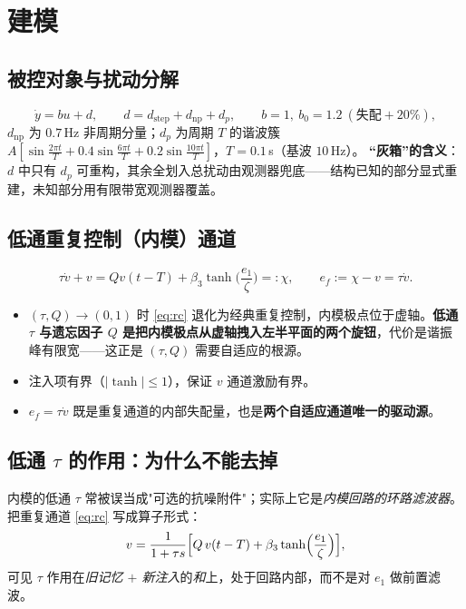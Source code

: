 \documentclass[11pt,a4paper]{article}
\theoremstyle{remark}\newtheorem{remark}{注}
\newcommand{\ef}{e_f}
\newcommand{\st}{\operatorname{tanh}}
\begin{document}
\section{建模}\label{sec:model}
\subsection{被控对象与扰动分解}
\begin{equation}
  \dot y = b u+d,\qquad d = d_{\mathrm{step}}+d_{\mathrm{np}}+d_p,\qquad b=1,\ b_0=1.2\ (\text{失配}+20\%),
\end{equation}
$d_{\mathrm{np}}$ 为 $0.7\,$Hz 非周期分量；$d_p$ 为周期 $T$ 的谐波簇
$A[\sin\frac{2\pi t}{T}+0.4\sin\frac{6\pi t}{T}+0.2\sin\frac{10\pi t}{T}]$，$T=0.1\,$s（基波 $10\,$Hz）。
\textbf{“灰箱”的含义}：$d$ 中只有 $d_p$ 可重构，其余全划入总扰动由观测器兜底——结构已知的部分显式重建，未知部分用有限带宽观测器覆盖。
\subsection{低通重复控制（内模）通道}
\begin{equation}
  \tau\dot v+v = Q v(t-T)+\beta_3\st\!\Big(\frac{e_1}{\zeta}\Big)=:\chi,
  \qquad \ef := \chi-v = \tau\dot v .
  \label{eq:rc}
\end{equation}
\begin{itemize}
  \item $(\tau,Q)\to(0,1)$ 时 \eqref{eq:rc} 退化为经典重复控制，内模极点位于虚轴。\textbf{低通 $\tau$ 与遗忘因子 $Q$ 是把内模极点从虚轴拽入左半平面的两个旋钮}，代价是谐振峰有限宽——这正是 $(\tau,Q)$ 需要自适应的根源。
  \item 注入项有界（$|\st|\le1$），保证 $v$ 通道激励有界。
  \item $\ef=\tau\dot v$ 既是重复通道的内部失配量，也是\textbf{两个自适应通道唯一的驱动源}。
\end{itemize}
\subsection{低通 $\tau$ 的作用：为什么不能去掉}\label{sec:tau-role}
内模的低通 $\tau$ 常被误当成"可选的抗噪附件"；实际上它是\emph{内模回路的环路滤波器}。
把重复通道 \eqref{eq:rc} 写成算子形式：
\begin{equation}
v=\frac{1}{1+\tau s}\Bigl[Q\,v(t-T)+\beta_3\tanh\Bigl(\frac{e_1}{\zeta}\Bigr)\Bigr],
\label{eq:tau-loop}
\end{equation}
可见 $\tau$ 作用在\emph{旧记忆 $+$ 新注入}的\emph{和}上，处于回路内部，而不是对 $e_1$ 做前置滤波。
\end{document}
